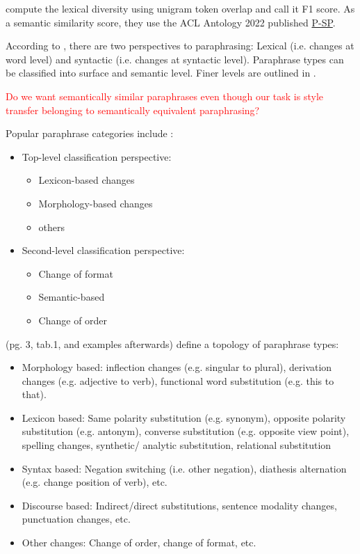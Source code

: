 \citet{krishna_paraphrasing_2023} compute the lexical diversity using unigram token overlap and call it F1 score.
As a semantic similarity score, they use the ACL Antology 2022 published \href{https://aclanthology.org/2022.emnlp-demos.38.pdf}{P-SP}.

According to \citet{gohsen_task_oriented_2024}, there are two perspectives to paraphrasing: 
Lexical (i.e. changes at word level) and syntactic (i.e. changes at syntactic level).
Paraphrase types can be classified into surface and semantic level. Finer levels are outlined in \citep{gohsen_task_oriented_2024}.

\textcolor{red}{Do we want semantically similar paraphrases even though our task is style transfer belonging to semantically equivalent paraphrasing?}

Popular paraphrase categories include \citep{fu_learning_2024}:
\begin{itemize}
    \item Top-level classification perspective: 
        \begin{itemize}
            \item Lexicon-based changes
            \item Morphology-based changes
            \item others
        \end{itemize}
    \item Second-level classification perspective:
        \begin{itemize}
            \item Change of format
            \item Semantic-based
            \item Change of order
        \end{itemize}
\end{itemize}
\citet{zhou_paraphrase_2025} (pg. 3, tab.1, and examples afterwards) define a topology of paraphrase types:
\begin{itemize}
    \item Morphology based: inflection changes (e.g. singular to plural), derivation changes (e.g. adjective to verb), functional word substitution (e.g. this to that).
    \item Lexicon based: Same polarity substitution (e.g. synonym), opposite polarity substitution (e.g. antonym), converse substitution (e.g. opposite view point), spelling changes, synthetic/ analytic substitution, relational substitution
    \item Syntax based: Negation switching (i.e. other negation), diathesis alternation (e.g. change position of verb), etc.
    \item Discourse based: Indirect/direct substitutions, sentence modality changes, punctuation changes, etc.
    \item Other changes: Change of order, change of format, etc.
\end{itemize}

